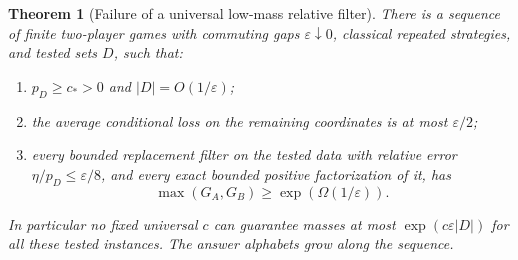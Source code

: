 \documentclass[11pt,reqno]{amsart}
\numberwithin{equation}{section}
\newtheorem{theorem}{Theorem}[section]
\theoremstyle{definition}
\theoremstyle{remark}
\newcommand{\eps}{\varepsilon}
\begin{document}
\begin{theorem}[Failure of a universal low-mass relative filter]\label{thm:filterNoGo}
There is a sequence of finite two-player games with commuting gaps \(\eps\downarrow0\), classical repeated strategies, and tested sets \(D\), such that:
\begin{enumerate}
\item \(p_D\ge c_*>0\) and \(|D|=O(1/\eps)\);
\item the average conditional loss on the remaining coordinates is at most \(\eps/2\);
\item every bounded replacement filter on the tested data with relative error \(\eta/p_D\le\eps/8\), and every exact bounded positive factorization of it, has
\[
 \max(G_A,G_B)\ge\exp(\Omega(1/\eps)).
\]
\end{enumerate}
In particular no fixed universal \(c\) can guarantee masses at most
\(\exp(c\eps|D|)\) for all these tested instances. The answer alphabets grow along the sequence.
\end{theorem}
\end{document}
